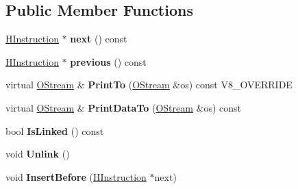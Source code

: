\subsection*{Public Member Functions}
\begin{DoxyCompactItemize}
\item 
\hypertarget{classv8_1_1internal_1_1_h_instruction_a9d29db127d6b84d78fd83c6210c67373}{}\hyperlink{classv8_1_1internal_1_1_h_instruction}{H\+Instruction} $\ast$ {\bfseries next} () const \label{classv8_1_1internal_1_1_h_instruction_a9d29db127d6b84d78fd83c6210c67373}

\item 
\hypertarget{classv8_1_1internal_1_1_h_instruction_aa317dc653ee98b47c0cc517785d4a8dc}{}\hyperlink{classv8_1_1internal_1_1_h_instruction}{H\+Instruction} $\ast$ {\bfseries previous} () const \label{classv8_1_1internal_1_1_h_instruction_aa317dc653ee98b47c0cc517785d4a8dc}

\item 
\hypertarget{classv8_1_1internal_1_1_h_instruction_adeb618ba2ad8bf7af71ba733b03d294a}{}virtual \hyperlink{classv8_1_1internal_1_1_o_stream}{O\+Stream} \& {\bfseries Print\+To} (\hyperlink{classv8_1_1internal_1_1_o_stream}{O\+Stream} \&os) const V8\+\_\+\+O\+V\+E\+R\+R\+I\+D\+E\label{classv8_1_1internal_1_1_h_instruction_adeb618ba2ad8bf7af71ba733b03d294a}

\item 
\hypertarget{classv8_1_1internal_1_1_h_instruction_abe6f5539297333581eb3d1320f94c730}{}virtual \hyperlink{classv8_1_1internal_1_1_o_stream}{O\+Stream} \& {\bfseries Print\+Data\+To} (\hyperlink{classv8_1_1internal_1_1_o_stream}{O\+Stream} \&os) const \label{classv8_1_1internal_1_1_h_instruction_abe6f5539297333581eb3d1320f94c730}

\item 
\hypertarget{classv8_1_1internal_1_1_h_instruction_a0737a8647d62e10cf5eb5edff24bbce6}{}bool {\bfseries Is\+Linked} () const \label{classv8_1_1internal_1_1_h_instruction_a0737a8647d62e10cf5eb5edff24bbce6}

\item 
\hypertarget{classv8_1_1internal_1_1_h_instruction_a8a41f7ab33dca87ccf47c3e8d0371fe0}{}void {\bfseries Unlink} ()\label{classv8_1_1internal_1_1_h_instruction_a8a41f7ab33dca87ccf47c3e8d0371fe0}

\item 
\hypertarget{classv8_1_1internal_1_1_h_instruction_aafa2427dae17803315948b5d7271dd39}{}void {\bfseries Insert\+Before} (\hyperlink{classv8_1_1internal_1_1_h_instruction}{H\+Instruction} $\ast$next)\label{classv8_1_1internal_1_1_h_instruction_aafa2427dae17803315948b5d7271dd39}


\end{DoxyCompactItemize}
